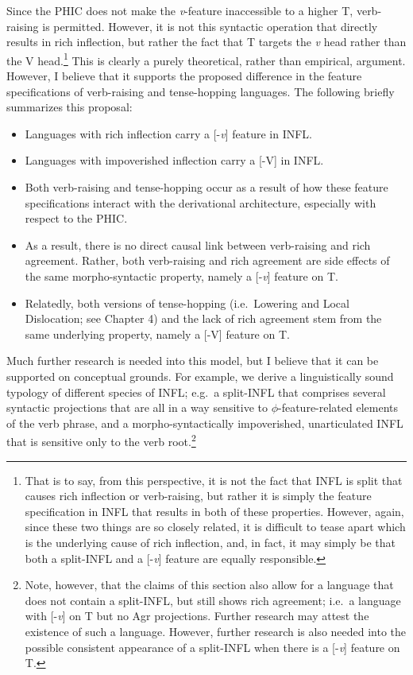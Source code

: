 Since the PHIC does not make the {\it v}-feature inaccessible to a higher T\raisebox{-3pt}{\footnotesize{[-{\it v}]}}, verb-raising is permitted. However, it is not this syntactic operation that directly results in rich inflection, but rather the fact that T targets the {\it v} head rather than the V head.\footnote{That is to say, from this perspective, it is not the fact that INFL is split that causes rich inflection or verb-raising, but rather it is simply the feature specification in INFL that results in both of these properties. However, again, since these two things are so closely related, it is difficult to tease apart which is the underlying cause of rich inflection, and, in fact, it may simply be that both a split-INFL and a [-{\it v}] feature are equally responsible.} This is clearly a purely theoretical, rather than empirical, argument. However, I believe that it supports the proposed difference in the feature specifications of verb-raising and tense-hopping languages. The following briefly summarizes this proposal:

\singlespacing
\begin{itemize}
\item Languages with rich inflection carry a [-{\it v}] feature in INFL.
\item Languages with impoverished inflection carry a [-V] in INFL.
\item Both verb-raising and tense-hopping occur as a result of how these feature specifications interact with the derivational architecture, especially with respect to the PHIC.
\item As a result, there is no direct causal link between verb-raising and rich agreement. Rather, both verb-raising and rich agreement are side effects of the same morpho-syntactic property, namely a [-{\it v}] feature on T.
\item Relatedly, both versions of tense-hopping (i.e.\ Lowering and Local Dislocation; see Chapter 4) and the lack of rich agreement stem from the same underlying property, namely a [-V] feature on T.
\end{itemize}
\onehalfspacing
Much further research is needed into this model, but I believe that it can be supported on conceptual grounds. For example, we derive a linguistically sound typology of different species of INFL; e.g.\ a split-INFL that comprises several syntactic projections that are all in a way sensitive to $\phi$-feature-related elements of the verb phrase, and a morpho-syntactically impoverished, unarticulated INFL that is sensitive only to the verb root.\footnote{Note, however, that the claims of this section also allow for a language that does not contain a split-INFL, but still shows rich agreement; i.e.\ a language with [-{\it v}] on T but no Agr projections. Further research may attest the existence of such a language. However, further research is also needed into the possible consistent appearance of a split-INFL when there is a [-{\it v}] feature on T.}

